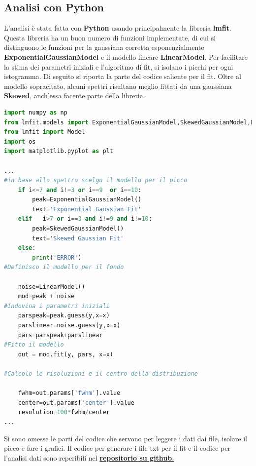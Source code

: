 \documentclass[a4paper]{article}
\begin{document}
\subsection{Analisi con Python}
L'analisi è stata fatta con \textbf{Python} usando principalmente la libreria \textbf{lmfit}. Questa libreria ha un buon numero di funzioni implementate, di cui si distinguono le funzioni per la gaussiana corretta esponenzialmente \textbf{ExponentialGaussianModel} e il modello lineare \textbf{LinearModel}. Per facilitare la stima dei parametri iniziali e l'algoritmo di fit, si isolano i picchi per ogni istogramma. Di seguito si riporta la parte del codice saliente per il fit. Oltre al modello sopracitato, alcuni spettri risultano meglio fittati da una gaussiana \textbf{Skewed}, anch'essa facente parte della libreria.
\begin{lstlisting}[language=Python]
import numpy as np
from lmfit.models import ExponentialGaussianModel,SkewedGaussianModel,LinearModel
from lmfit import Model
import os
import matplotlib.pyplot as plt

...
#in base allo spettro scelgo il modello per il picco
    if i<=7 and i!=3 or i==9  or i==10:
        peak=ExponentialGaussianModel()
        text='Exponential Gaussian Fit'
    elif   i>7 or i==3 and i!=9 and i!=10:
        peak=SkewedGaussianModel()
        text='Skewed Gaussian Fit'
    else:
        print('ERROR')
#Definisco il modello per il fondo

    noise=LinearModel()
    mod=peak + noise
#Indovina i parametri iniziali
    parspeak=peak.guess(y,x=x)
    parslinear=noise.guess(y,x=x)
    pars=parspeak+parslinear
#Fitto il modello
    out = mod.fit(y, pars, x=x)
    
#Calcolo le risoluzioni e il centro della distribuzione

    fwhm=out.params['fwhm'].value
    center=out.params['center'].value
    resolution=100*fwhm/center
...
\end{lstlisting}
Si sono omesse le parti del codice che servono per leggere i dati dai file, isolare il picco e fare i grafici. Il codice per generare i file txt per il fit e il codice per l'analisi dati sono reperibili nel \href{https://github.com/Jake145/Gruppo-3-Lab-Fisica-Medica/tree/master/BGORESOLUTION}{\textbf{repositorio su github.}}
\end{document}
